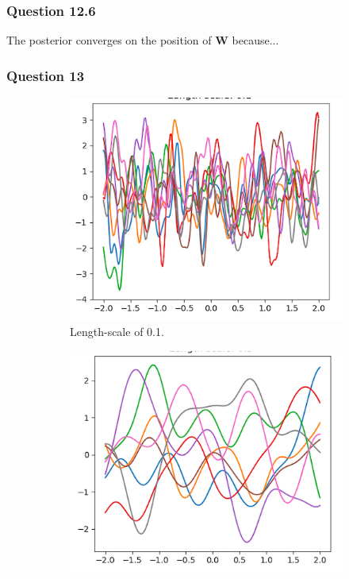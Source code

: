 \documentclass[10pt, a4paper, twocolumn]{article} %
\begin{document}
\subsubsection*{Question 12.6}
The posterior converges on the position of $\mathbf{W}$ because... 
\subsubsection*{Question 13}

\begin{figure}[!htb]
\centering
\begin{subfigure}{.5\linewidth}
  \centering
  \includegraphics[width=.9\linewidth]{ls01.png}
  \caption{Length-scale of 0.1.}
  \label{fig:sub1}
\end{subfigure}%
\begin{subfigure}{.5\linewidth}
  \centering
  \includegraphics[width=.9\linewidth]{ls05.png}

\end{subfigure}
\end{figure}
\end{document}
